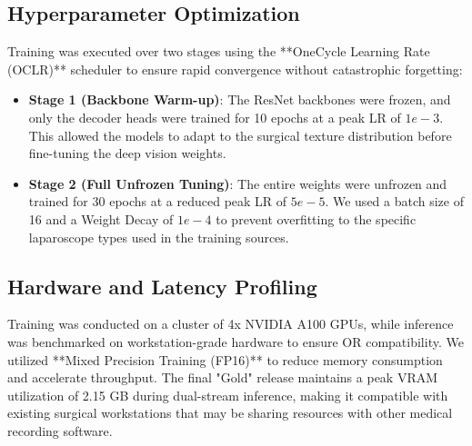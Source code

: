 \documentclass[conference]{IEEEtran}
\begin{document}
\subsection{Hyperparameter Optimization}
Training was executed over two stages using the **OneCycle Learning Rate (OCLR)** scheduler to ensure rapid convergence without catastrophic forgetting:
\begin{itemize}
    \item \textbf{Stage 1 (Backbone Warm-up)}: The ResNet backbones were frozen, and only the decoder heads were trained for 10 epochs at a peak LR of $1e-3$. This allowed the models to adapt to the surgical texture distribution before fine-tuning the deep vision weights.
    \item \textbf{Stage 2 (Full Unfrozen Tuning)}: The entire weights were unfrozen and trained for 30 epochs at a reduced peak LR of $5e-5$. We used a batch size of 16 and a Weight Decay of $1e-4$ to prevent overfitting to the specific laparoscope types used in the training sources.
\end{itemize}

\subsection{Hardware and Latency Profiling}
Training was conducted on a cluster of 4x NVIDIA A100 GPUs, while inference was benchmarked on workstation-grade hardware to ensure OR compatibility. We utilized **Mixed Precision Training (FP16)** to reduce memory consumption and accelerate throughput. The final "Gold" release maintains a peak VRAM utilization of 2.15 GB during dual-stream inference, making it compatible with existing surgical workstations that may be sharing resources with other medical recording software.
\end{document}
